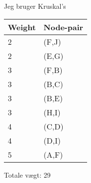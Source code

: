 \documentclass{article}
\begin{document}
Jeg bruger Kruskal's 
\begin{table}[H]
\centering
\begin{tabular}{|l|l|}
\hline
\rowcolor[HTML]{C0C0C0} 
Weight  & Node-pair \\ \hline
2       & (F,J)     \\ \hline
2       & (E,G)     \\ \hline
3       & (F,B)     \\ \hline
3       & (B,C)     \\ \hline
3       & (B,E)     \\ \hline
3       & (H,I)     \\ \hline
4       & (C,D)     \\ \hline
4       & (D,I)     \\ \hline
5       & (A,F)     \\ \hline
\end{tabular}
\end{table}

Totale vægt: 29
\end{document}
